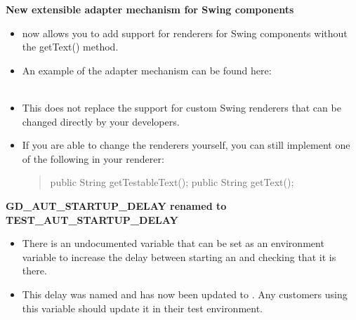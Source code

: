\textbf{New extensible adapter mechanism for Swing components}\\
\begin{itemize}
\item \app{} now allows you to add support for renderers for Swing components without the getText() method.
\item An example of the adapter mechanism can be found here:\\
\\
\item This does not replace the support for custom Swing renderers that can be changed directly by your developers. 
\item If you are able to change the renderers yourself, you can still implement one of the following in your renderer:
\begin{quote}
public String getTestableText();
public String getText();
\end{quote}
\end{itemize}


\textbf{GD\_AUT\_STARTUP\_DELAY renamed to TEST\_AUT\_STARTUP\_DELAY}\\
\begin{itemize}
\item There is an undocumented variable that can be set as an environment variable to increase the delay between starting an \gdaut{} and checking that it is there.
\item This delay was named  and has now been updated to . Any customers using this variable should update it in their test environment. 
\end{itemize}
